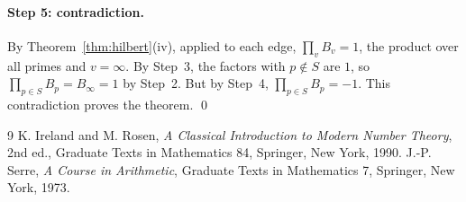 \documentclass[11pt]{article}
\begin{document}
\paragraph{Step 5: contradiction.} By Theorem~\ref{thm:hilbert}(iv), applied to each edge, $\prod_vB_v=1$, the product over all primes and $v=\infty$. By Step~3, the factors with $p\notin S$ are $1$, so $\prod_{p\in S}B_p=B_\infty=1$ by Step~2. But by Step~4, $\prod_{p\in S}B_p=-1$. This contradiction proves the theorem.
\qed

\begin{thebibliography}{9}
 K. Ireland and M. Rosen, \emph{A Classical Introduction to Modern Number Theory}, 2nd ed., Graduate Texts in Mathematics 84, Springer, New York, 1990.
 J.-P. Serre, \emph{A Course in Arithmetic}, Graduate Texts in Mathematics 7, Springer, New York, 1973.
\end{thebibliography}
\end{document}
